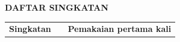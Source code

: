 \cleardoublepage
\vspace{2cm}
\begin{center}
{\fontsize{14}{16.8}\selectfont\textbf{DAFTAR SINGKATAN}}\\[1em]
\end{center}
\label{chap:singkatan}
\setcounter{chapter}{0}
\setcounter{section}{0}
\vspace{2em}




\begin{longtable}{@{} l >{\raggedright\arraybackslash}p{7.2cm} c @{}}
\multicolumn{1}{l}{\textbf{Singkatan}} & \multicolumn{1}{l}{\textbf{Deskripsi}} & \multicolumn{1}{l}{\parbox[c]{3.5cm}{\raggedright \textbf{Pemakaian pertama kali}}} \\




\end{longtable}
